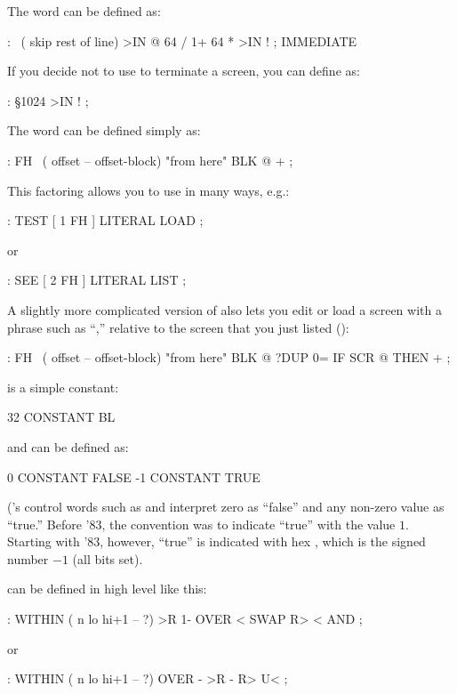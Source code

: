 The word \forthb{\bs} can be defined as:
\begin{Code}
: \  ( skip rest of line)
     >IN @  64 / 1+  64 *  >IN ! ; IMMEDIATE
\end{Code}
If you decide not to use  to terminate a screen, you can
define  as:
\begin{Code}
: \S   1024 >IN ! ;
\end{Code}
%
The word  can be defined simply as:
\begin{Code}
: FH   \   ( offset -- offset-block)   "from here"
    BLK @ + ;
\end{Code}
This factoring allows you to use  in many ways, e.g.:
\begin{Code}
: TEST   [ 1 FH ] LITERAL LOAD ;
\end{Code}
or
\begin{Code}
: SEE   [ 2 FH ] LITERAL LIST ;
\end{Code}
A slightly more complicated version of  also lets you edit or
load a screen with a phrase such as ``,'' relative to
the screen that you just listed ():
\begin{Code}
: FH   \   ( offset -- offset-block)   "from here"
     BLK @  ?DUP 0= IF  SCR @  THEN  + ;
\end{Code}
 is a simple constant:
\begin{Code}
32 CONSTANT BL
\end{Code}
 and 
can be defined as:
\begin{Code}
0 CONSTANT FALSE
-1 CONSTANT TRUE
\end{Code}
(\Forth{}'s control words such as  and  interpret
zero as ``false'' and any non-zero value as ``true.''  Before \Forth{}
'83, the convention was to indicate ``true'' with the value $1$.  Starting
with \Forth{} '83, however, ``true'' is indicated with hex ,
which is the signed number $-1$ (all bits set).

 can be defined in high level like this:
\begin{Code}
: WITHIN  ( n lo hi+1 -- ?)
     >R  1- OVER <  SWAP R>  < AND ;
\end{Code}
or
\begin{Code}
: WITHIN ( n lo hi+1 -- ?)
   OVER -  >R - R> U< ;
\end{Code}

